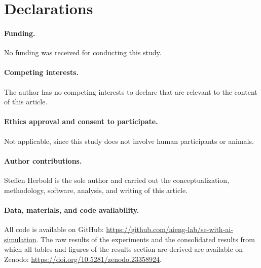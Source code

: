 \section*{Declarations}

\paragraph{Funding.} No funding was received for conducting this study.

\paragraph{Competing interests.} The author has no competing interests to declare that are relevant to the content of this article.

\paragraph{Ethics approval and consent to participate.} Not applicable, since this study does not involve human participants or animals.

\paragraph{Author contributions.} Steffen Herbold is the sole author and carried out the conceptualization, methodology, software, analysis, and writing of this article.

\paragraph{Data, materials, and code availability.} All code is available on GitHub: \url{https://github.com/aieng-lab/se-with-ai-simulation}. The raw results of the experiments and the consolidated results from which all tables and figures of the results section are derived are available on Zenodo: \url{https://doi.org/10.5281/zenodo.23358924}.
